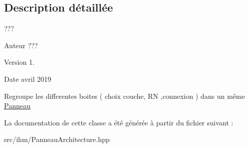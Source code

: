 \subsection{Description détaillée}
??? 

\begin{DoxyAuthor}{Auteur}
??? 
\end{DoxyAuthor}
\begin{DoxyVersion}{Version}
1. 
\end{DoxyVersion}
\begin{DoxyDate}{Date}
avril 2019
\end{DoxyDate}
Regroupe les differentes boites ( choix couche, RN ,connexion ) dans un même \hyperlink{classPanneau}{Panneau} 

La documentation de cette classe a été générée à partir du fichier suivant \+:\begin{DoxyCompactItemize}
\item 
src/ihm/Panneau\+Architecture.\+hpp\end{DoxyCompactItemize}
